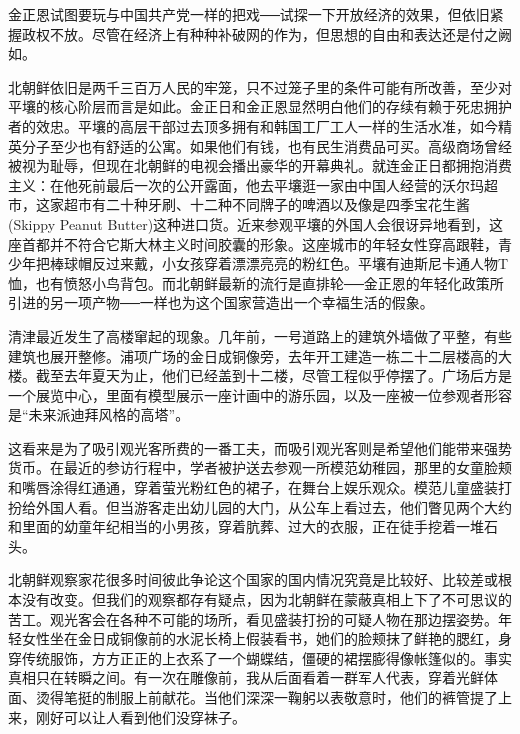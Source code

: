 金正恩试图要玩与中国共产党一样的把戏──试探一下开放经济的效果，但依旧紧握政权不放。尽管在经济上有种种补破网的作为，但思想的自由和表达还是付之阙如。

北朝鲜依旧是两千三百万人民的牢笼，只不过笼子里的条件可能有所改善，至少对平壤的核心阶层而言是如此。金正日和金正恩显然明白他们的存续有赖于死忠拥护者的效忠。平壤的高层干部过去顶多拥有和韩国工厂工人一样的生活水准，如今精英分子至少也有舒适的公寓。如果他们有钱，也有民生消费品可买。高级商场曾经被视为耻辱，但现在北朝鲜的电视会播出豪华的开幕典礼。就连金正日都拥抱消费主义：在他死前最后一次的公开露面，他去平壤逛一家由中国人经营的沃尔玛超市，这家超市有二十种牙刷、十二种不同牌子的啤酒以及像是四季宝花生酱(Skippy Peanut Butter)这种进口货。近来参观平壤的外国人会很讶异地看到，这座首都并不符合它斯大林主义时间胶囊的形象。这座城市的年轻女性穿高跟鞋，青少年把棒球帽反过来戴，小女孩穿着漂漂亮亮的粉红色。平壤有迪斯尼卡通人物T恤，也有愤怒小鸟背包。而北朝鲜最新的流行是直排轮──金正恩的年轻化政策所引进的另一项产物──一样也为这个国家营造出一个幸福生活的假象。

清津最近发生了高楼窜起的现象。几年前，一号道路上的建筑外墙做了平整，有些建筑也展开整修。浦项广场的金日成铜像旁，去年开工建造一栋二十二层楼高的大楼。截至去年夏天为止，他们已经盖到十二楼，尽管工程似乎停摆了。广场后方是一个展览中心，里面有模型展示一座计画中的游乐园，以及一座被一位参观者形容是“未来派迪拜风格的高塔”。

这看来是为了吸引观光客所费的一番工夫，而吸引观光客则是希望他们能带来强势货币。在最近的参访行程中，学者被护送去参观一所模范幼稚园，那里的女童脸颊和嘴唇涂得红通通，穿着萤光粉红色的裙子，在舞台上娱乐观众。模范儿童盛装打扮给外国人看。但当游客走出幼儿园的大门，从公车上看过去，他们瞥见两个大约和里面的幼童年纪相当的小男孩，穿着肮葬、过大的衣服，正在徒手挖着一堆石头。

北朝鲜观察家花很多时间彼此争论这个国家的国内情况究竟是比较好、比较差或根本没有改变。但我们的观察都存有疑点，因为北朝鲜在蒙蔽真相上下了不可思议的苦工。观光客会在各种不可能的场所，看见盛装打扮的可疑人物在那边摆姿势。年轻女性坐在金日成铜像前的水泥长椅上假装看书，她们的脸颊抹了鲜艳的腮红，身穿传统服饰，方方正正的上衣系了一个蝴蝶结，僵硬的裙摆膨得像帐篷似的。事实真相只在转瞬之间。有一次在雕像前，我从后面看着一群军人代表，穿着光鲜体面、烫得笔挺的制服上前献花。当他们深深一鞠躬以表敬意时，他们的裤管提了上来，刚好可以让人看到他们没穿袜子。

